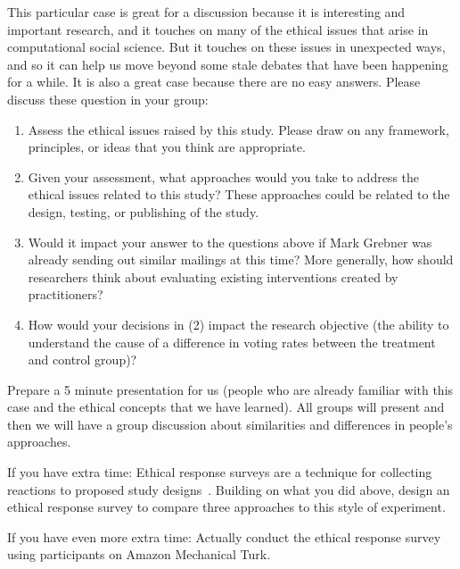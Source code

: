 \documentclass{article}
\begin{document}
This particular case is great for a discussion because it is interesting and important research, and it touches on many of the ethical issues that arise in computational social science.  But it touches on these issues in unexpected ways, and so it can help us move beyond some stale debates that have been happening for a while.  It is also a great case because there are no easy answers.  Please discuss these question in your group:

\begin{enumerate}
\item Assess the ethical issues raised by this study.  Please draw on any framework, principles, or ideas that you think are appropriate.
\item Given your assessment, what approaches would you take to address the ethical issues related to this study?  These approaches could be related to the design, testing, or publishing of the study.
\item Would it impact your answer to the questions above if Mark Grebner was already sending out similar mailings at this time?  More generally, how should researchers think about evaluating existing interventions created by practitioners?
\item How would your decisions in (2) impact the research objective (the ability to understand the cause of a difference in voting rates between the treatment and control group)?
\end{enumerate}
 
Prepare a 5 minute presentation for us (people who are already familiar with this case and the ethical concepts that we have learned).  All groups will present and then we will have a group discussion about similarities and differences in people's approaches.
 
If you have extra time: Ethical response surveys are a technique for collecting reactions to proposed study designs~\citep{schechter_using_2014}.  Building on what you did above, design an ethical response survey to compare three approaches to this style of experiment.
 
If you have even more extra time: Actually conduct the ethical response survey using participants on Amazon Mechanical Turk.
\end{document}

